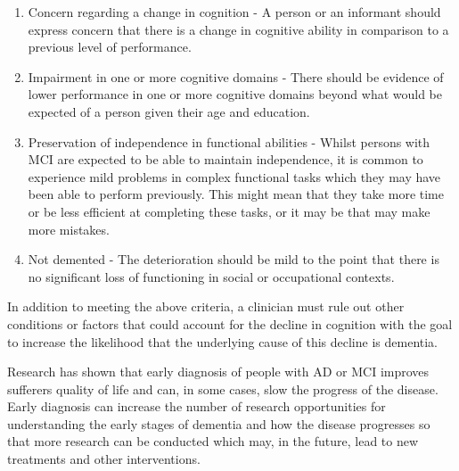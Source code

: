 \documentclass[10pt, letterpaper, twoside, openany]{thesis}
\begin{document}
\begin{enumerate}
	\item Concern regarding a change in cognition - A person or an informant should express concern that there is a change in cognitive ability in comparison to a previous level of performance.
	\item Impairment in one or more cognitive domains - There should be evidence of lower performance in one or more cognitive domains beyond what would be expected of a person given their age and education. 
	\item Preservation of independence in functional abilities - Whilst persons with MCI are expected to be able to maintain independence, it is common to experience mild problems in complex functional tasks which they may have been able to perform previously. This might mean that they take more time or be less efficient at completing these tasks, or it may be that may make more mistakes.
	\item Not demented - The deterioration should be mild to the point that there is no significant loss of functioning in social or occupational contexts.
\end{enumerate}
In addition to meeting the above criteria, a clinician must rule out other conditions or factors that could account for the decline in cognition with the goal to increase the likelihood that the underlying cause of this decline is dementia. 
\par
Research has shown that early diagnosis of people with AD or MCI improves sufferers quality of life and can, in some cases, slow the progress of the disease. Early diagnosis can increase the number of research opportunities for understanding the early stages of dementia and how the disease progresses so that more research can be conducted which may, in the future, lead to new treatments and other interventions.
\end{document}
